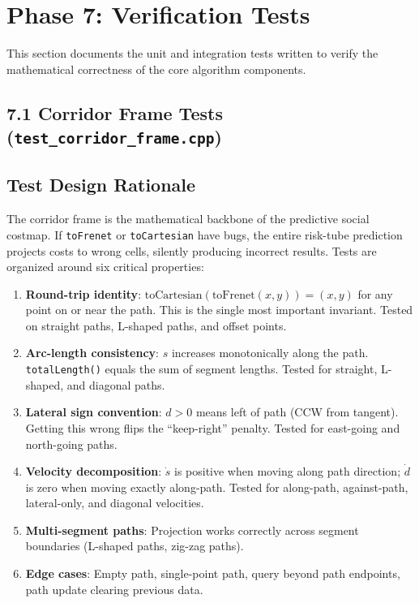 \documentclass[11pt]{article}
\newcommand{\logentry}[1]{\subsection*{#1}}
\begin{document}
\section{Phase 7: Verification Tests}

This section documents the unit and integration tests written to verify the
mathematical correctness of the core algorithm components.

\subsection*{7.1 Corridor Frame Tests (\texttt{test\_corridor\_frame.cpp})}

\logentry{Test Design Rationale}
The corridor frame is the mathematical backbone of the predictive social costmap.
If \texttt{toFrenet} or \texttt{toCartesian} have bugs, the entire risk-tube
prediction projects costs to wrong cells, silently producing incorrect results.
Tests are organized around six critical properties:

\begin{enumerate}
  \item \textbf{Round-trip identity}: $\mathrm{toCartesian}(\mathrm{toFrenet}(x,y))
    = (x,y)$ for any point on or near the path. This is the single most important
    invariant. Tested on straight paths, L-shaped paths, and offset points.
  \item \textbf{Arc-length consistency}: $s$ increases monotonically along the
    path. \texttt{totalLength()} equals the sum of segment lengths. Tested for
    straight, L-shaped, and diagonal paths.
  \item \textbf{Lateral sign convention}: $d > 0$ means left of path (CCW from
    tangent). Getting this wrong flips the ``keep-right'' penalty. Tested for
    east-going and north-going paths.
  \item \textbf{Velocity decomposition}: $\dot{s}$ is positive when moving along
    path direction; $\dot{d}$ is zero when moving exactly along-path. Tested for
    along-path, against-path, lateral-only, and diagonal velocities.
  \item \textbf{Multi-segment paths}: Projection works correctly across segment
    boundaries (L-shaped paths, zig-zag paths).
  \item \textbf{Edge cases}: Empty path, single-point path, query beyond path
    endpoints, path update clearing previous data.
\end{enumerate}
\end{document}
